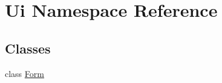 \hypertarget{namespaceUi}{
\section{Ui Namespace Reference}
\label{namespaceUi}
}


\subsection*{Classes}
\begin{CompactItemize}
\item 
class \hyperlink{classUi_1_1Form}{Form}
\end{CompactItemize}
